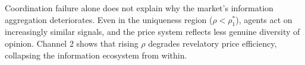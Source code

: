Coordination failure alone does not explain why the market's information aggregation deteriorates. Even in the uniqueness region ($\rho < \rho_1^*$), agents act on increasingly similar signals, and the price system reflects less genuine diversity of opinion. Channel 2 shows that rising $\rho$ degrades revelatory price efficiency, collapsing the information ecosystem from within.
